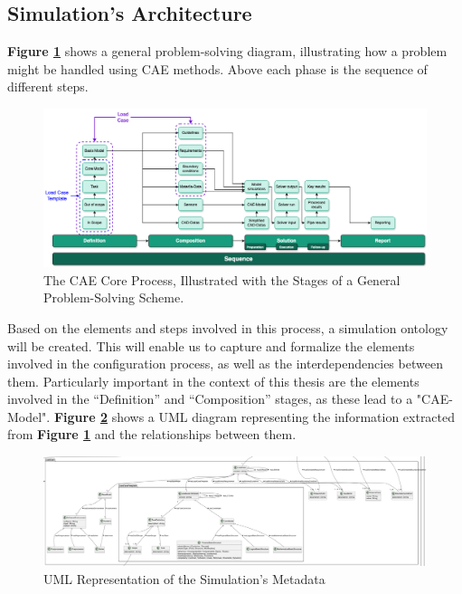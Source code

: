 \subsection{Simulation's Architecture \label{subsec:sim-archi}}
\textbf{Figure \ref{fig:cea-proc}} shows a general problem-solving diagram, illustrating how a problem might be handled using CAE methods. Above each phase is the sequence of different steps.\\

\begin{figure}[h]
    \centering
    \includegraphics[width=\textwidth]{images/Concept-cae-process.drawio.png}
    \caption{\label{fig:cea-proc}  The CAE Core Process, Illustrated with the Stages of a General Problem-Solving Scheme. \cite{assistSim}}
\end{figure}

Based on the elements and steps involved in this process, a simulation ontology will be created. This will enable us to capture and formalize the elements involved in the configuration process, as well as the interdependencies between them. Particularly important in the context of this thesis are the elements involved in the “Definition” and “Composition” stages, as these lead to a "CAE-Model". \textbf{Figure \ref{fig:uml-sim}} shows a UML diagram representing the information extracted from \textbf{Figure \ref{fig:cea-proc}} and the relationships between them.\\

\begin{figure}[h]
    \centering
    \includegraphics[width=\textwidth]{images/UML-Sim.png}
    \caption{\label{fig:uml-sim}  UML Representation of the Simulation’s Metadata}
\end{figure}


